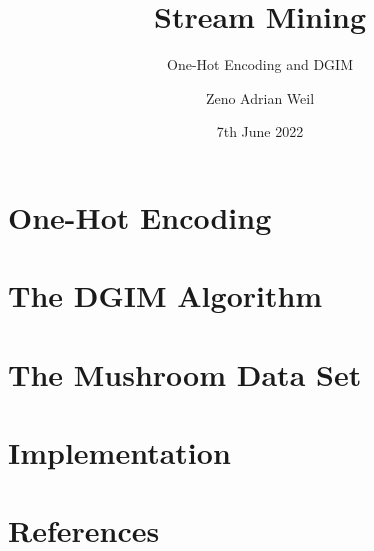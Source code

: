 \documentclass[
	9pt,
	a4paper,
	handout
]{beamer}
\title{Stream Mining}
\subtitle{One-Hot Encoding and DGIM}
\author{Zeno Adrian Weil}
\institute{Data Science 1 \\ Goethe University Frankfurt}
\date{7th June 2022}
\begin{document}
	\begin{frame}[plain]
		\titlepage
	\end{frame}

	\section{One-Hot Encoding}
	

	\section{The DGIM Algorithm}
	
	
	\section{The Mushroom Data Set}
	
	
	\section{Implementation}
	

	\section{References}
	
\end{document}
